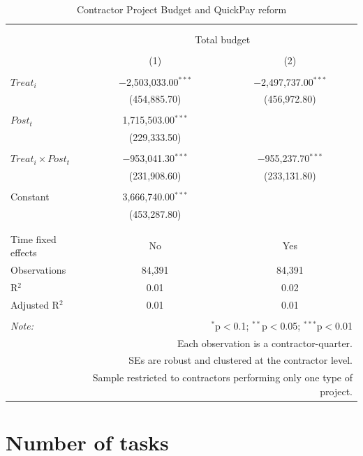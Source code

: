 \documentclass[
]{article}
\begin{document}
\begin{table}[H] \centering 
  \caption{Contractor Project Budget and QuickPay reform} 
  \label{} 
\small 
\begin{tabular}{@{\extracolsep{-2pt}}lcc} 
\\[-1.8ex]\hline 
\hline \\[-1.8ex] 
\\[-1.8ex] & \multicolumn{2}{c}{Total budget} \\ 
\\[-1.8ex] & (1) & (2)\\ 
\hline \\[-1.8ex] 
 $Treat_i$ & $-$2,503,033.00$^{***}$ & $-$2,497,737.00$^{***}$ \\ 
  & (454,885.70) & (456,972.80) \\ 
  & & \\ 
 $Post_t$ & 1,715,503.00$^{***}$ &  \\ 
  & (229,333.50) &  \\ 
  & & \\ 
 $Treat_i \times Post_t$ & $-$953,041.30$^{***}$ & $-$955,237.70$^{***}$ \\ 
  & (231,908.60) & (233,131.80) \\ 
  & & \\ 
 Constant & 3,666,740.00$^{***}$ &  \\ 
  & (453,287.80) &  \\ 
  & & \\ 
\hline \\[-1.8ex] 
Time fixed effects & No & Yes \\ 
Observations & 84,391 & 84,391 \\ 
R$^{2}$ & 0.01 & 0.02 \\ 
Adjusted R$^{2}$ & 0.01 & 0.01 \\ 
\hline 
\hline \\[-1.8ex] 
\textit{Note:}  & \multicolumn{2}{r}{$^{*}$p$<$0.1; $^{**}$p$<$0.05; $^{***}$p$<$0.01} \\ 
 & \multicolumn{2}{r}{Each observation is a contractor-quarter.} \\ 
 & \multicolumn{2}{r}{SEs are robust and clustered at the contractor level.} \\ 
 & \multicolumn{2}{r}{Sample restricted to contractors performing only one type of project.} \\ 
\end{tabular} 
\end{table}

\hypertarget{number-of-tasks}{%
\section{Number of tasks}\label{number-of-tasks}}
\end{document}
